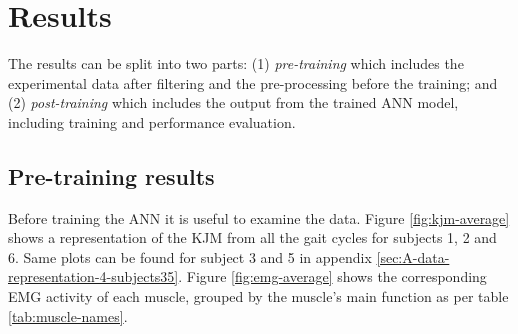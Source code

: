 \documentclass[../main.tex]{subfiles}
\begin{document}
\chapter{Results}
\label{sec:results}
The results can be split into two parts: (1) \textit{pre-training} which includes the experimental data after filtering and the pre-processing before the training; and (2) \textit{post-training} which includes the output from the trained \ac{ANN} model, including training and performance evaluation.

\section{Pre-training results}
\label{sec:results_pre-training-results}
Before training the \ac{ANN} it is useful to examine the data.
Figure \ref{fig:kjm-average} shows a representation of the \ac{KJM} from all the gait cycles for subjects 1, 2 and 6.
Same plots can be found for subject 3 and 5 in appendix \ref{sec:A-data-representation-4-subjects35}. 
Figure \ref{fig:emg-average} shows the corresponding \ac{EMG} activity of each muscle, grouped by the muscle's main function as per table \ref{tab:muscle-names}.
\end{document}
